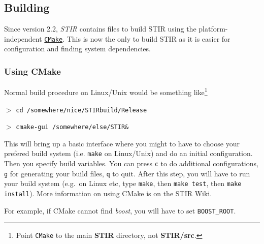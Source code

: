 \documentclass{article}
\def\url#1#2{\mbox{\href{#1}{\tt #2}}}
\newcommand{\cmdline}[1]{\par \noindent $>$ \texttt{#1}\par}
\begin{document}
\subsection{
Building}
Since version 2.2, \textit{STIR} contains files to build STIR using the platform-independent
\url{"http://www.cmake.org"}{CMake}. This is now the only to build STIR as
it is easier for configuration and finding system dependencies.
\subsubsection{
Using CMake}
\label{sec:UsingCMake}

Normal build procedure on Linux/Unix would be something like\footnote{Point \texttt{CMake} to the main \textbf{STIR}
directory, not \textbf{STIR/src}.}

\cmdline{cd /somewhere/nice/STIRbuild/Release}
\cmdline{cmake-gui /somewhere/else/STIR\&}

This will bring up a basic interface where you might to have to choose your prefered
build system (i.e. \texttt{make} on Linux/Unix) and do an initial configuration. Then 
you specify build variables. You can press \texttt{c} to do additional configurations, \texttt{g} for generating
your build files, \texttt{q} to quit. After this step, you will have to run your build system (e.g.\ on Linux etc,
type \texttt{make}, then \texttt{make test}, then \texttt{make install}).
More information on using CMake is on the STIR Wiki.

For example, if CMake cannot find \textit{boost}, you will have to set \texttt{BOOST\_ROOT}. 
\newlength{\MakeTableFirstCol}
\newlength{\MakeTableSecondCol}
\setlength{\MakeTableFirstCol}{1.5in}
\setlength{\MakeTableSecondCol}{\textwidth}
\addtolength{\MakeTableSecondCol}{-\MakeTableFirstCol}
\end{document}
